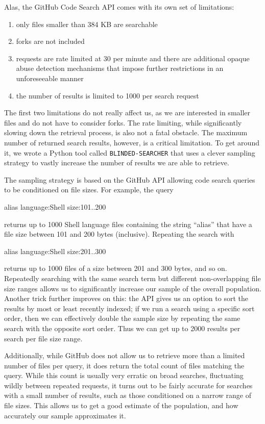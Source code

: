 Alas, the GitHub Code Search API comes with its own set of limitations:
\begin{enumerate}
    \item only files smaller than 384 KB are searchable
    \item forks are not included
    \item requests are rate limited at 30 per minute and there are additional opaque abuse detection mechanisms that impose further restrictions in an unforeseeable manner
    \item the number of results is limited to 1000 per search request
\end{enumerate}
The first two limitations do not really affect us, as we are interested in smaller files and do not have to consider forks.
The rate limiting, while significantly slowing down the retrieval process, is also not a fatal obstacle.
The maximum number of returned search results, however, is a critical limitation.
To get around it, we wrote a Python tool called \verb|BLINDED-SEARCHER| that uses a clever sampling strategy to vastly increase the number of results we are able to retrieve.

The sampling strategy is based on the GitHub API allowing code search queries to be conditioned on file sizes. 
For example, the query 
\begin{CVerbatim}
alias language:Shell size:101..200
\end{CVerbatim}
returns up to 1000 Shell language files containing the string ``alias'' that have a file size between 101 and 200 bytes (inclusive).
Repeating the search with 
\begin{CVerbatim}
alias language:Shell size:201..300
\end{CVerbatim}
returns up to 1000 files of a size between 201 and 300 bytes, and so on.
Repeatedly searching with the same search term but different non-overlapping file size ranges allows us to significantly increase our sample of the overall population.
Another trick further improves on this: 
the API gives us an option to sort the results by most or least recently indexed;
if we run a search using a specific sort order, then we can effectively double the sample size by repeating the same search with the opposite sort order.
Thus we can get up to 2000 results per search per file size range.

Additionally, while GitHub does not allow us to retrieve more than a limited number of files per query, it does return the total count of files matching the query.
While this count is usually very erratic on broad searches, fluctuating wildly between repeated requests, it turns out to be fairly accurate for searches with a small number of results, such as those conditioned on a narrow range of file sizes.
This allows us to get a good estimate of the population, and how accurately our sample approximates it.

